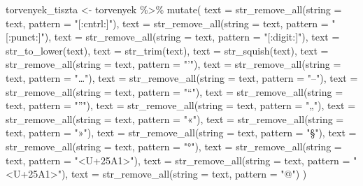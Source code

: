 \documentclass[
]{book}
\newenvironment{Shaded}{\begin{snugshade}}{\end{snugshade}}
\newcommand{\AttributeTok}[1]{\textcolor[rgb]{0.77,0.63,0.00}{#1}}
\newcommand{\FunctionTok}[1]{\textcolor[rgb]{0.00,0.00,0.00}{#1}}
\newcommand{\NormalTok}[1]{#1}
\newcommand{\OtherTok}[1]{\textcolor[rgb]{0.56,0.35,0.01}{#1}}
\newcommand{\SpecialCharTok}[1]{\textcolor[rgb]{0.00,0.00,0.00}{#1}}
\newcommand{\StringTok}[1]{\textcolor[rgb]{0.31,0.60,0.02}{#1}}
\begin{document}
\begin{Shaded}
\begin{Highlighting}[]
\NormalTok{torvenyek\_tiszta }\OtherTok{\textless{}{-}}\NormalTok{ torvenyek }\SpecialCharTok{\%\textgreater{}\%}
  \FunctionTok{mutate}\NormalTok{(}
    \AttributeTok{text =} \FunctionTok{str\_remove\_all}\NormalTok{(}\AttributeTok{string =}\NormalTok{ text, }\AttributeTok{pattern =} \StringTok{"[:cntrl:]"}\NormalTok{),}
    \AttributeTok{text =} \FunctionTok{str\_remove\_all}\NormalTok{(}\AttributeTok{string =}\NormalTok{ text, }\AttributeTok{pattern =} \StringTok{"[:punct:]"}\NormalTok{),}
    \AttributeTok{text =} \FunctionTok{str\_remove\_all}\NormalTok{(}\AttributeTok{string =}\NormalTok{ text, }\AttributeTok{pattern =} \StringTok{"[:digit:]"}\NormalTok{),}
    \AttributeTok{text =} \FunctionTok{str\_to\_lower}\NormalTok{(text),}
    \AttributeTok{text =} \FunctionTok{str\_trim}\NormalTok{(text),}
    \AttributeTok{text =} \FunctionTok{str\_squish}\NormalTok{(text),}
    \AttributeTok{text =} \FunctionTok{str\_remove\_all}\NormalTok{(}\AttributeTok{string =}\NormalTok{ text, }\AttributeTok{pattern =} \StringTok{"’"}\NormalTok{),}
    \AttributeTok{text =} \FunctionTok{str\_remove\_all}\NormalTok{(}\AttributeTok{string =}\NormalTok{ text, }\AttributeTok{pattern =} \StringTok{"…"}\NormalTok{),}
    \AttributeTok{text =} \FunctionTok{str\_remove\_all}\NormalTok{(}\AttributeTok{string =}\NormalTok{ text, }\AttributeTok{pattern =} \StringTok{"–"}\NormalTok{),}
    \AttributeTok{text =} \FunctionTok{str\_remove\_all}\NormalTok{(}\AttributeTok{string =}\NormalTok{ text, }\AttributeTok{pattern =} \StringTok{"“"}\NormalTok{),}
    \AttributeTok{text =} \FunctionTok{str\_remove\_all}\NormalTok{(}\AttributeTok{string =}\NormalTok{ text, }\AttributeTok{pattern =} \StringTok{"”"}\NormalTok{),}
    \AttributeTok{text =} \FunctionTok{str\_remove\_all}\NormalTok{(}\AttributeTok{string =}\NormalTok{ text, }\AttributeTok{pattern =} \StringTok{"„"}\NormalTok{),}
    \AttributeTok{text =} \FunctionTok{str\_remove\_all}\NormalTok{(}\AttributeTok{string =}\NormalTok{ text, }\AttributeTok{pattern =} \StringTok{"«"}\NormalTok{),}
    \AttributeTok{text =} \FunctionTok{str\_remove\_all}\NormalTok{(}\AttributeTok{string =}\NormalTok{ text, }\AttributeTok{pattern =} \StringTok{"»"}\NormalTok{),}
    \AttributeTok{text =} \FunctionTok{str\_remove\_all}\NormalTok{(}\AttributeTok{string =}\NormalTok{ text, }\AttributeTok{pattern =} \StringTok{"§"}\NormalTok{),}
    \AttributeTok{text =} \FunctionTok{str\_remove\_all}\NormalTok{(}\AttributeTok{string =}\NormalTok{ text, }\AttributeTok{pattern =} \StringTok{"°"}\NormalTok{),}
    \AttributeTok{text =} \FunctionTok{str\_remove\_all}\NormalTok{(}\AttributeTok{string =}\NormalTok{ text, }\AttributeTok{pattern =} \StringTok{"\textless{}U+25A1\textgreater{}"}\NormalTok{),}
    \AttributeTok{text =} \FunctionTok{str\_remove\_all}\NormalTok{(}\AttributeTok{string =}\NormalTok{ text, }\AttributeTok{pattern =} \StringTok{"\textless{}U+25A1\textgreater{}"}\NormalTok{),}
    \AttributeTok{text =} \FunctionTok{str\_remove\_all}\NormalTok{(}\AttributeTok{string =}\NormalTok{ text, }\AttributeTok{pattern =} \StringTok{"@"}\NormalTok{)}
\NormalTok{  )}
\end{Highlighting}
\end{Shaded}
\end{document}
